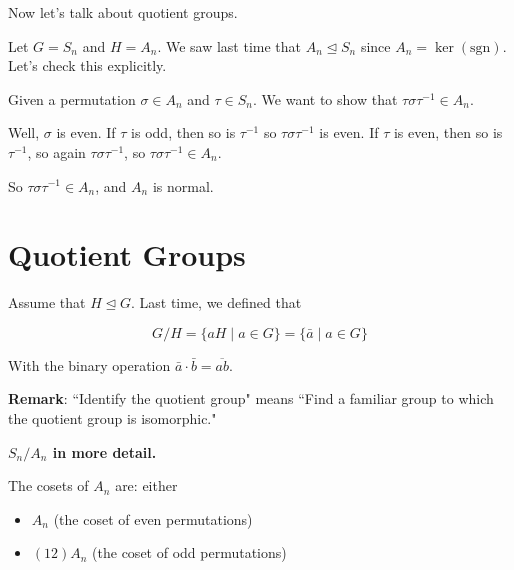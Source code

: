 \documentclass[12pt]{article}
\def\sgn{\text{sgn}}
\def\sgn{\text{sgn}}
\begin{document}
Now let's talk about quotient groups.

Let $G = S_n$ and $H = A_n$. We saw last time that $A_n \trianglelefteq S_n$
since $A_n = \ker(\sgn)$. Let's check this explicitly.

Given a permutation $\sigma \in A_n$ and $\tau \in S_n$. We want to show that
$\tau \sigma \tau^{-1} \in A_n$.

Well, $\sigma$ is even. If $\tau$ is odd, then so is $\tau^{-1}$ so $\tau
\sigma \tau^{-1}$ is even. If $\tau$ is even, then so is $\tau^{-1}$, so again
$\tau \sigma \tau^{-1}$, so $\tau \sigma \tau^{-1} \in A_n$.


So $\tau \sigma \tau^{-1} \in A_n$, and $A_n$ is normal.

\section{Quotient Groups}

Assume that $H \trianglelefteq G$. Last time, we defined that

\[
  G / H = \{aH \mid a \in G\} = \{\bar a \mid a \in G \}
\]

With the binary operation $\bar a \cdot \bar b = \overline{ab}$.


{\bf Remark}: ``Identify the quotient group" means ``Find a familiar group to
which the quotient group is isomorphic."


{\bf $S_n / A_n$ in more detail.}

The cosets of $A_n$ are: either

\begin{itemize}
  \item $A_n$ (the coset of even permutations)
  \item $(12)A_n$ (the coset of odd permutations)
\end{itemize}
\end{document}
